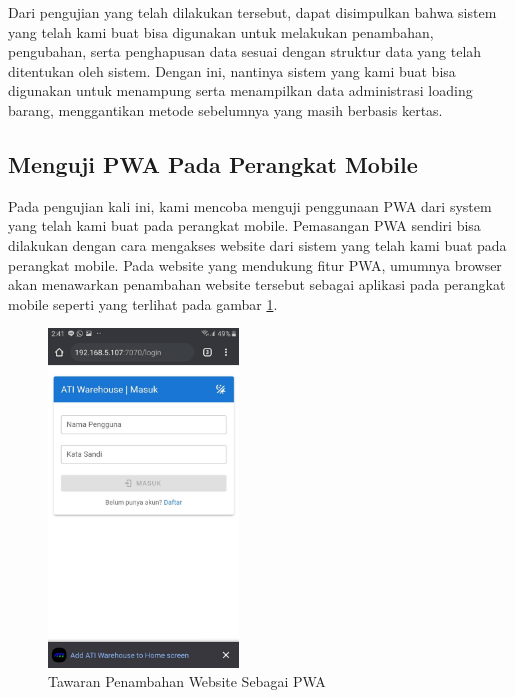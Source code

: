 Dari pengujian yang telah dilakukan tersebut, dapat disimpulkan bahwa sistem yang telah kami buat bisa digunakan untuk melakukan penambahan, pengubahan, serta penghapusan data sesuai dengan struktur data yang telah ditentukan oleh sistem.
Dengan ini, nantinya sistem yang kami buat bisa digunakan untuk menampung serta menampilkan data administrasi loading barang, menggantikan metode sebelumnya yang masih berbasis kertas.
\vspace{0.5ex}

\subsection{Menguji PWA Pada Perangkat Mobile}
\vspace{1ex}

Pada pengujian kali ini, kami mencoba menguji penggunaan PWA dari system yang telah kami buat pada perangkat mobile.
Pemasangan PWA sendiri bisa dilakukan dengan cara mengakses website dari sistem yang telah kami buat pada perangkat mobile.
Pada website yang mendukung fitur PWA, umumnya browser akan menawarkan penambahan website tersebut sebagai aplikasi pada perangkat mobile seperti yang terlihat pada gambar \ref{fig:pasangPwa}.
\vspace{0.5ex}

\begin{figure} [ht!] \centering
  \includegraphics[width=0.45\textwidth]{gambar/pasang-pwa.jpg}
  \caption{Tawaran Penambahan Website Sebagai PWA}
	\label{fig:pasangPwa}
\end{figure}

